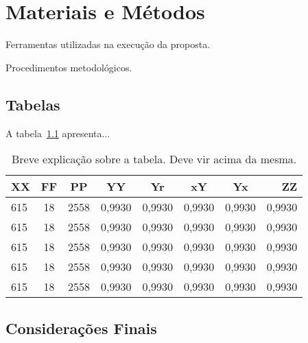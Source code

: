 \chapter{Materiais e Métodos}\label{cap:ferramentas}

Ferramentas utilizadas na execução da proposta.

Procedimentos metodológicos.

\lipsum[43-44]

\section{Tabelas}\label{sec:tabelas}

A tabela~\ref{tab:tabela} apresenta...

 \begin{table}[htpb]
   \centering
   \caption{Breve explicação sobre a tabela. Deve vir acima da mesma.}\label{tab:tabela}
   \begin{tabular}{lccccccr}\hline\hline
        \small{XX} & \small{FF} & \small{PP} & \small{YY} & \small{Yr} & \small{xY} & \small{Yx} & \small{ZZ} \\ \hline
               615 &    18      &     2558   &    0,9930  &    0,9930  &    0,9930  &    0,9930  &    0,9930  \\ 
               615 &    18      &     2558   &    0,9930  &    0,9930  &    0,9930  &    0,9930  &    0,9930  \\ 
               615 &    18      &     2558   &    0,9930  &    0,9930  &    0,9930  &    0,9930  &    0,9930  \\ 
               615 &    18      &     2558   &    0,9930  &    0,9930  &    0,9930  &    0,9930  &    0,9930  \\ 
               615 &    18      &     2558   &    0,9930  &    0,9930  &    0,9930  &    0,9930  &    0,9930  \\ 
  \hline\hline
  \end{tabular}
\end{table}

\lipsum[34-35]

\section{Considerações Finais}

\lipsum[23]
